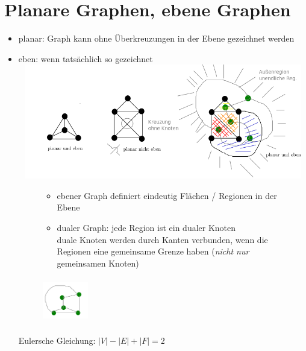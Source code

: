         \section{Planare Graphen, ebene Graphen}
        \begin{itemize}
        \item planar: Graph kann ohne Überkreuzungen in der Ebene gezeichnet werden
        \item eben: wenn tatsächlich so gezeichnet\\
        \includegraphics[width=14cm,height=5cm,keepaspectratio]{./Pictures/plan_ebe_Gr.png}\\
        \begin{figure}[htbp]
            \begin{minipage}[t]{12cm}
                \vspace{0cm}
                \begin{itemize}
                    \item ebener Graph definiert eindeutig Flächen / Regionen in der Ebene
                    \item dualer Graph: jede Region ist ein dualer Knoten\\
                    duale Knoten werden durch Kanten verbunden, wenn die Regionen eine gemeinsame Grenze haben (\emph{nicht nur} gemeinsamen Knoten)
                \end{itemize}
            \end{minipage}
            \begin{minipage}[t]{4cm}
                \vspace{-0.5cm}
                \includegraphics[width=2cm,height=2cm,keepaspectratio]{./Pictures/gruenerGraph.png}\\
            \end{minipage}
        \end{figure}

        Eulersche Gleichung: $|V| - |E| + |F| = 2$
    \end{itemize}
